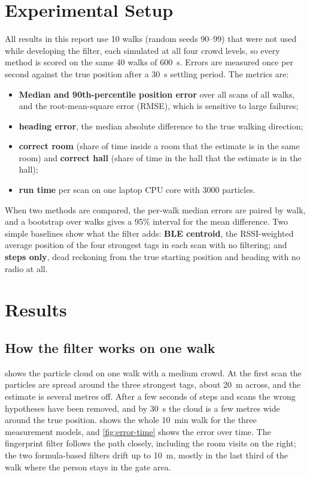 \documentclass[11pt,a4paper]{article}
\begin{document}
\section{Experimental Setup}
\label{sec:setup}

All results in this report use 10 walks (random seeds 90--99) that were not used while
developing the filter, each simulated at all four crowd levels, so every method is
scored on the same 40 walks of \SI{600}{s}. Errors are measured once per second against
the true position after a \SI{30}{s} settling period. The metrics are:
\begin{itemize}
  \item \textbf{Median and 90th-percentile position error} over all scans of all walks,
        and the root-mean-square error (RMSE), which is sensitive to large failures;
  \item \textbf{heading error}, the median absolute difference to the true walking direction;
  \item \textbf{correct room} (share of time inside a room that the estimate is in the
        same room) and \textbf{correct hall} (share of time in the hall that the estimate
        is in the hall);
  \item \textbf{run time} per scan on one laptop CPU core with 3000 particles.
\end{itemize}
When two methods are compared, the per-walk median errors are paired by walk, and a
bootstrap over walks gives a 95\% interval for the mean difference. Two simple
baselines show what the filter adds:
\textbf{BLE centroid}, the RSSI-weighted average position of the four strongest tags
in each scan with no filtering; and \textbf{steps only}, dead reckoning from the true
starting position and heading with no radio at all.

\section{Results}
\label{sec:results}

\subsection{How the filter works on one walk}
 shows the particle cloud on one walk with a medium crowd. At the
first scan the particles are spread around the three strongest tags, about
\SI{20}{m} across, and the estimate is several metres off. After a few seconds of steps
and scans the wrong hypotheses have been removed, and by \SI{30}{s} the cloud is a few
metres wide around the true position.  shows the whole
\SI{10}{min} walk for the three measurement models, and \cref{fig:error-time} shows the
error over time. The fingerprint filter follows the path closely, including the room
visits on the right; the two formula-based filters drift up to \SI{10}{m}, mostly in the
last third of the walk where the person stays in the gate area.
\end{document}
